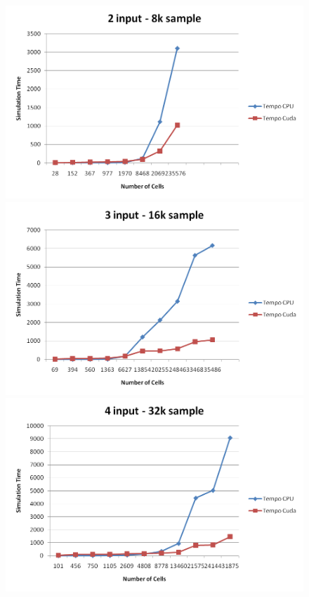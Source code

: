 \begin{figure}
\centering
\includegraphics[width=\columnwidth]{img/graph1.png}
\label{graph1}
\includegraphics[width=\columnwidth]{img/graph2.png}
\label{graph2}
\includegraphics[width=\columnwidth]{img/graph3.png}

\end{figure}
